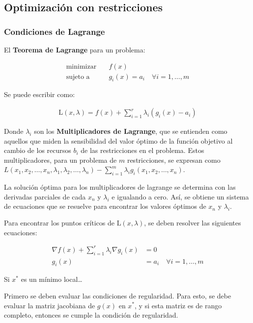 \documentclass{article}
\begin{document}
\subsection{Optimizaci\'on con restricciones}

\subsubsection{Condiciones de Lagrange}

El \textbf{Teorema de Lagrange} para un problema:

\begin{align*}
    \text{minimizar} \quad & f(x) \\
    \text{sujeto a} \quad & g_i(x) = a_i \quad \forall i = 1, \ldots, m
\end{align*}

Se puede escribir como:

\begin{align*}
    \mathrm{L}(x, \lambda) = f(x) + \sum_{i=1}^r \lambda_i (g_i(x) - a_i)
\end{align*}

Donde $\lambda_i$ son los \textbf{Multiplicadores de Lagrange}, que se entienden como aquellos que miden la sensibilidad del valor óptimo de la función objetivo al cambio de los recursos $b_i$ de las restricciones en el problema. Estos multiplicadores, para un problema de $m$ restricciones, se expresan como $L(x_1, x_2, \dots, x_n, \lambda_1, \lambda_2, \dots, \lambda_n) - \sum_{i=1}^{m} \lambda_i g_i(x_1,x_2,\dots,x_n)$.

La solución óptima para los multiplicadores de lagrange se determina con las derivadas parciales de cada $x_n$ y $\lambda_i$ e igualando a cero. Así, se obtiene un sistema de ecuaciones que se resuelve para encontrar los valores óptimos de $x_n$ y $\lambda_i$.

Para encontrar los puntos críticos de $\mathrm{L}(x, \lambda)$, se deben resolver las siguientes ecuaciones:

\begin{align*}
    \nabla f(x) + \sum_{i=1}^r \lambda_i \nabla g_i(x) &= 0 \\
    g_i(x) &= a_i \quad \forall i = 1, \ldots, m
\end{align*}

Si $x^*$ es un mínimo local\dots


Primero se deben evaluar las condiciones de regularidad. Para esto, se debe evaluar la matriz jacobiana de $g(x)$ en $x^*$, y si esta matriz es de rango completo, entonces se cumple la condición de regularidad.
\end{document}
